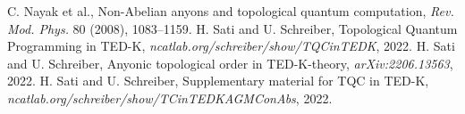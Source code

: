 \documentclass{article}
\theoremstyle{definition}
\begin{document}
\begin{thebibliography}{9}
 C. Nayak et al., Non-Abelian anyons and topological quantum computation, \emph{Rev. Mod. Phys.} 80 (2008), 1083--1159.
 H. Sati and U. Schreiber, Topological Quantum Programming in TED-K, \emph{ncatlab.org/schreiber/show/TQCinTEDK}, 2022.
 H. Sati and U. Schreiber, Anyonic topological order in TED-K-theory, \emph{arXiv:2206.13563}, 2022.
 H. Sati and U. Schreiber, Supplementary material for TQC in TED-K, \emph{ncatlab.org/schreiber/show/TCinTEDKAGMConAbs}, 2022.
\end{thebibliography}
\end{document}
